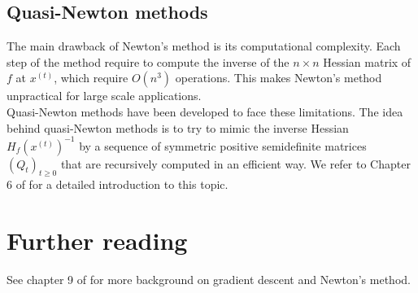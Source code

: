 \documentclass[11pt,nocut]{article}
\begin{document}
\subsection{Quasi-Newton methods}

The main drawback of Newton's method is its computational complexity. Each step of the method require to compute the inverse of the $n \times n$ Hessian matrix of $f$ at $x^{(t)}$, which require $O(n^3)$ operations. This makes Newton's method unpractical for large scale applications.
\\

Quasi-Newton methods have been developed to face these limitations. 
The idea behind quasi-Newton methods is to try to mimic the inverse Hessian $H_f(x^{(t)})^{-1}$ by a sequence of symmetric positive semidefinite matrices $(Q_t)_{t \geq 0}$ that are recursively computed in an efficient way. We refer to Chapter 6 of \cite{nocedal2006numerical} for a detailed introduction to this topic.



\section*{Further reading}

See chapter 9 of \cite{boyd2004convex} for more background on gradient descent and Newton's method.

\vspace{1cm}
\centerline{}




\end{document}
